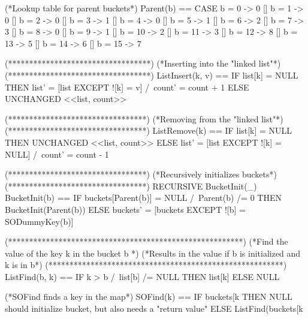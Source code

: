 \documentclass{uit-thesis}
\begin{document}
\begin{tla}
                     (*Lookup table for parent buckets*)
                     Parent(b) ==    CASE b = 0 -> 0
                     [] b = 1 -> 0
                     [] b = 2 -> 0
                     [] b = 3 -> 1
                     [] b = 4 -> 0
                     [] b = 5 -> 1
                     [] b = 6 -> 2
                     [] b = 7 -> 3
                     [] b = 8 -> 0
                     [] b = 9 -> 1
                     [] b = 10 -> 2
                     [] b = 11 -> 3
                     [] b = 12 -> 8
                     [] b = 13 -> 5
                     [] b = 14 -> 6
                     [] b = 15 -> 7
                     
                     
                     (**********************************)
                     (*Inserting into the "linked list"*)
                     (**********************************)
                     ListInsert(k, v) == IF list[k] = NULL
                     THEN list' = [list EXCEPT ![k] = v] /\ count' = count + 1
                     ELSE UNCHANGED <<list, count>>
                     
                     (*********************************)
                     (*Removing from the "linked list"*)
                     (*********************************)
                     ListRemove(k) == IF list[k] = NULL
                     THEN UNCHANGED <<list, count>>
                     ELSE list' = [list EXCEPT ![k] = NULL] /\ count' = count - 1
                     
                     (*********************************)
                     (*Recursively initializes buckets*)
                     (*********************************)
                     RECURSIVE BucketInit(_)
                     BucketInit(b) == IF buckets[Parent(b)] = NULL /\ Parent(b) /= 0
                     THEN BucketInit(Parent(b))
                     ELSE buckets' = [buckets EXCEPT ![b] = SODummyKey(b)]
                     
                     (********************************************************)
                     (*Find the value of the key k in the bucket b           *)
                     (*Results in the value if b is initialized and k is in b*)
                     (********************************************************)
                     ListFind(b, k) == IF k > b /\ list[b] /= NULL THEN list[k] ELSE NULL
                     
                     (*SOFind finds a key in the map*)
                     SOFind(k) == IF buckets[k %
                     THEN NULL \* should initialize bucket, but also needs a "return value"
                     ELSE ListFind(buckets[k %
                     

\end{tla}
\end{document}
